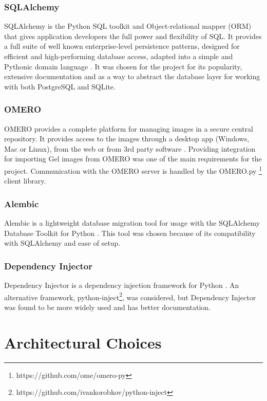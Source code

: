 \subsubsection{SQLAlchemy}
SQLAlchemy is the Python SQL toolkit and Object-relational mapper (ORM) that gives application developers the full power and flexibility of SQL. It provides a full suite of well known enterprise-level persistence patterns, designed for efficient and high-performing database access, adapted into a simple and Pythonic domain language \cite{sqlalchemy}. It was chosen for the project for its popularity, extensive documentation and as a way to abstract the database layer for working with both PostgreSQL and SQLite.

\subsubsection{OMERO}
OMERO provides a complete platform for managing images in a secure central repository. It provides access to the images through a desktop app (Windows, Mac or Linux), from the web or from 3rd party software  \cite{omero}. Providing integration for importing Gel images from OMERO was one of the main requirements for the project. Communication with the OMERO server is handled by the OMERO.py \footnote{https://github.com/ome/omero-py} client library. 

\subsubsection{Alembic}
Alembic is a lightweight database migration tool for usage with the SQLAlchemy Database Toolkit for Python \cite{alembic}. This tool was chosen because of its compatibility with SQLAlchemy and ease of setup.

\subsubsection{Dependency Injector}

Dependency Injector is a dependency injection framework for Python \cite{di-framework}. An alternative framework, python-inject\footnote{https://github.com/ivankorobkov/python-inject}, was considered, but Dependency Injector was found to be more widely used and has better documentation.

\section{Architectural Choices}

